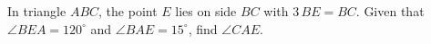 In triangle $ABC$, the point $E$ lies on side $BC$ with $3\,BE=BC$. Given that $\angle BEA=120^\circ$ and $\angle BAE=15^\circ$, find $\angle CAE$.
